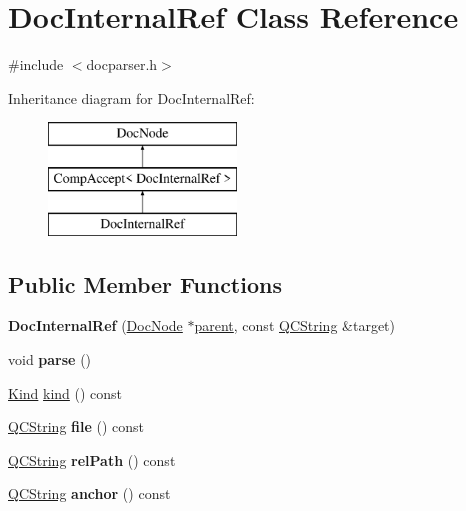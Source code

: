 \hypertarget{class_doc_internal_ref}{}\section{Doc\+Internal\+Ref Class Reference}
\label{class_doc_internal_ref}


{\ttfamily \#include $<$docparser.\+h$>$}

Inheritance diagram for Doc\+Internal\+Ref\+:\begin{figure}[H]
\begin{center}
\leavevmode
\includegraphics[height=3.000000cm]{class_doc_internal_ref}
\end{center}
\end{figure}
\subsection*{Public Member Functions}
\begin{DoxyCompactItemize}
\item 
\mbox{\label{class_doc_internal_ref_a15b7019ec093e3e7357e368a58530efb}} 
{\bfseries Doc\+Internal\+Ref} (\mbox{\hyperlink{class_doc_node}{Doc\+Node}} $\ast$\mbox{\hyperlink{class_doc_node_a73e8ad29a91cfceb0968eb00db71a23d}{parent}}, const \mbox{\hyperlink{class_q_c_string}{Q\+C\+String}} \&target)
\item 
\mbox{\label{class_doc_internal_ref_ab9cc38fde444889a618974f396bf36ed}} 
void {\bfseries parse} ()
\item 
\mbox{\hyperlink{class_doc_node_aebd16e89ca590d84cbd40543ea5faadb}{Kind}} \mbox{\hyperlink{class_doc_internal_ref_a8eb9f170bb5693a276a7e2ce0cdae1a4}{kind}} () const
\item 
\mbox{\label{class_doc_internal_ref_a770f32c338d58af80aa1db5eee306138}} 
\mbox{\hyperlink{class_q_c_string}{Q\+C\+String}} {\bfseries file} () const
\item 
\mbox{\label{class_doc_internal_ref_ab73c5c3f258c385136c1a92cf86cd4ac}} 
\mbox{\hyperlink{class_q_c_string}{Q\+C\+String}} {\bfseries rel\+Path} () const
\item 
\mbox{\label{class_doc_internal_ref_ae0ccb4c91d73cda323769f8ee3aa7957}} 
\mbox{\hyperlink{class_q_c_string}{Q\+C\+String}} {\bfseries anchor} () const
\end{DoxyCompactItemize}
